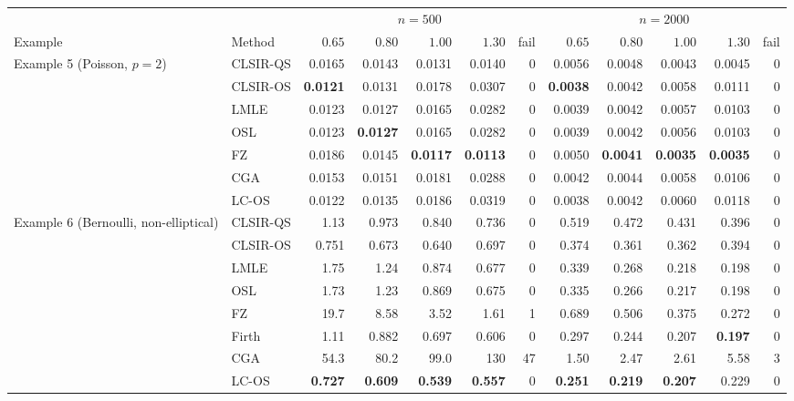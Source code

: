 \begin{tabular}{llrrrrrrrrrr}
\toprule
& & \multicolumn{5}{c}{$n=500$} & \multicolumn{5}{c}{$n=2000$}\\
\cmidrule(lr){3-7}\cmidrule(lr){8-12}
Example & Method & $0.65$ & $0.80$ & $1.00$ & $1.30$ & fail & $0.65$ & $0.80$ & $1.00$ & $1.30$ & fail\\
\midrule
Example 5 (Poisson, $p=2$) & CLSIR-QS & 0.0165 & 0.0143 & 0.0131 & 0.0140 & 0 & 0.0056 & 0.0048 & 0.0043 & 0.0045 & 0\\
 & CLSIR-OS & \textbf{0.0121} & 0.0131 & 0.0178 & 0.0307 & 0 & \textbf{0.0038} & 0.0042 & 0.0058 & 0.0111 & 0\\
 & LMLE & 0.0123 & 0.0127 & 0.0165 & 0.0282 & 0 & 0.0039 & 0.0042 & 0.0057 & 0.0103 & 0\\
 & OSL & 0.0123 & \textbf{0.0127} & 0.0165 & 0.0282 & 0 & 0.0039 & 0.0042 & 0.0056 & 0.0103 & 0\\
 & FZ & 0.0186 & 0.0145 & \textbf{0.0117} & \textbf{0.0113} & 0 & 0.0050 & \textbf{0.0041} & \textbf{0.0035} & \textbf{0.0035} & 0\\
 & CGA & 0.0153 & 0.0151 & 0.0181 & 0.0288 & 0 & 0.0042 & 0.0044 & 0.0058 & 0.0106 & 0\\
 & LC-OS & 0.0122 & 0.0135 & 0.0186 & 0.0319 & 0 & 0.0038 & 0.0042 & 0.0060 & 0.0118 & 0\\
\addlinespace
Example 6 (Bernoulli, non-elliptical) & CLSIR-QS & 1.13 & 0.973 & 0.840 & 0.736 & 0 & 0.519 & 0.472 & 0.431 & 0.396 & 0\\
 & CLSIR-OS & 0.751 & 0.673 & 0.640 & 0.697 & 0 & 0.374 & 0.361 & 0.362 & 0.394 & 0\\
 & LMLE & 1.75 & 1.24 & 0.874 & 0.677 & 0 & 0.339 & 0.268 & 0.218 & 0.198 & 0\\
 & OSL & 1.73 & 1.23 & 0.869 & 0.675 & 0 & 0.335 & 0.266 & 0.217 & 0.198 & 0\\
 & FZ & 19.7 & 8.58 & 3.52 & 1.61 & 1 & 0.689 & 0.506 & 0.375 & 0.272 & 0\\
 & Firth & 1.11 & 0.882 & 0.697 & 0.606 & 0 & 0.297 & 0.244 & 0.207 & \textbf{0.197} & 0\\
 & CGA & 54.3 & 80.2 & 99.0 & 130 & 47 & 1.50 & 2.47 & 2.61 & 5.58 & 3\\
 & LC-OS & \textbf{0.727} & \textbf{0.609} & \textbf{0.539} & \textbf{0.557} & 0 & \textbf{0.251} & \textbf{0.219} & \textbf{0.207} & 0.229 & 0\\
\bottomrule
\end{tabular}